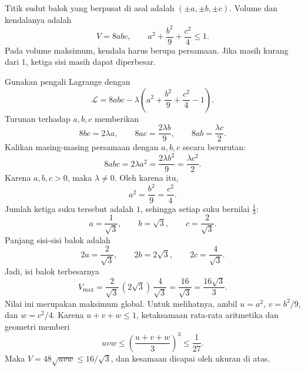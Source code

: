 \documentclass[11pt,a4paper]{article}
\begin{document}
\begin{enumerate}[itemsep=12pt,parsep=5pt]
        Titik sudut balok yang berpusat di asal adalah $(\pm a,\pm b,\pm c)$.
        Volume dan kendalanya adalah
        \[
          V=8abc,\qquad a^2+\frac{b^2}{9}+\frac{c^2}{4}\le1.
        \]
        Pada volume maksimum, kendala harus berupa persamaan.
        Jika masih kurang dari $1$, ketiga sisi masih dapat diperbesar.

        Gunakan pengali Lagrange dengan
        \[
          \mathcal L=8abc-\lambda\left(a^2+\frac{b^2}{9}+\frac{c^2}{4}-1\right).
        \]
        Turunan terhadap $a,b,c$ memberikan
        \[
          8bc=2\lambda a,\qquad
          8ac=\frac{2\lambda b}{9},\qquad
          8ab=\frac{\lambda c}{2}.
        \]
        Kalikan masing-masing persamaan dengan $a,b,c$ secara berurutan:
        \[
          8abc=2\lambda a^2
          =\frac{2\lambda b^2}{9}
          =\frac{\lambda c^2}{2}.
        \]
        Karena $a,b,c>0$, maka $\lambda\ne0$.
        Oleh karena itu,
        \[
          a^2=\frac{b^2}{9}=\frac{c^2}{4}.
        \]
        Jumlah ketiga suku tersebut adalah $1$, sehingga setiap suku bernilai $\frac13$:
        \[
          a=\frac1{\sqrt3},\qquad b=\sqrt3,\qquad c=\frac2{\sqrt3}.
        \]
        Panjang sisi-sisi balok adalah
        \[
          2a=\frac2{\sqrt3},\qquad 2b=2\sqrt3,\qquad 2c=\frac4{\sqrt3}.
        \]
        Jadi, isi balok terbesarnya
        \[
          \boxed{V_{\max}
            =\frac2{\sqrt3}\,(2\sqrt3)\,\frac4{\sqrt3}
            =\frac{16}{\sqrt3}=\frac{16\sqrt3}{3}.}
        \]
        Nilai ini merupakan maksimum global.
        Untuk melihatnya, ambil $u=a^2$, $v=b^2/9$, dan $w=c^2/4$.
        Karena $u+v+w\le1$, ketaksamaan rata-rata aritmetika dan geometri memberi
        \[
          uvw\le\left(\frac{u+v+w}{3}\right)^3\le\frac1{27}.
        \]
        Maka $V=48\sqrt{uvw}\le16/\sqrt3$, dan kesamaan dicapai oleh ukuran di atas.
\end{enumerate}
\end{document}
